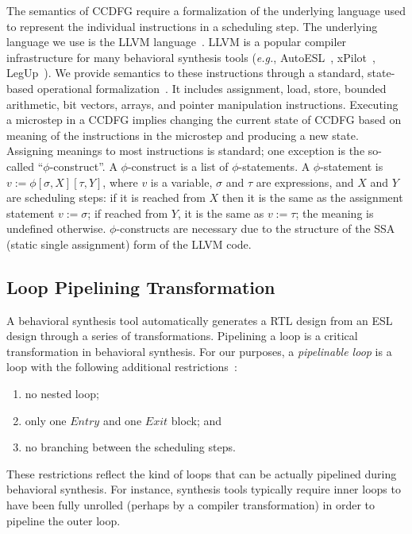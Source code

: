 The semantics of CCDFG require a formalization of the
underlying language used to represent the individual
instructions in a scheduling step.  The underlying language we use
is the LLVM language~\cite{llvm}. LLVM is a popular compiler
infrastructure for many behavioral synthesis tools
({\em e.g.}, AutoESL~\cite{autoesl}, xPilot~\cite{xpilot},
LegUp~\cite{legup}).  We provide semantics to these
instructions through a standard, state-based operational
formalization~\cite{McCarthy}. It includes assignment,
load, store, bounded arithmetic, bit vectors, arrays, and
pointer manipulation instructions. Executing a microstep in
a CCDFG implies changing the current state of CCDFG based on
meaning of the instructions in the microstep and producing a
new state. Assigning meanings to most instructions is
standard; one exception is the so-called ``$\phi$-construct''. A $\phi$-construct is a list of $\phi$-statements. A $\phi$-statement is $v := \phi [\sigma, X] [\tau, Y]$, where $v$ is a variable, $\sigma$
and $\tau$ are expressions, and $X$ and $Y$ are
scheduling steps: if it is reached from $X$ then it is the
same as the assignment statement $v := \sigma$; if
reached from $Y$, it is the same as $v := \tau$; the meaning is undefined otherwise. $\phi$-constructs are necessary due to the structure of the SSA (static single
assignment) form of the LLVM code.

\subsection{Loop Pipelining Transformation}
\label{subsec:loop-pipelining-trans}
A behavioral synthesis tool automatically generates a RTL design from an ESL design through a series of
transformations. Pipelining a loop is a critical
transformation in behavioral synthesis. For our purposes, a
{\em pipelinable loop} is a loop with the following additional restrictions~\cite{hrx:dac-12}:
\begin{enumerate}
\item no nested loop;
\item only one $Entry$ and one $Exit$ block; and
\item no branching between the scheduling steps.
\end{enumerate}
These restrictions reflect the kind of loops that can be
actually pipelined during behavioral synthesis. For
instance, synthesis tools typically require inner loops to
have been fully unrolled (perhaps by a compiler
transformation) in order to pipeline the outer loop.



